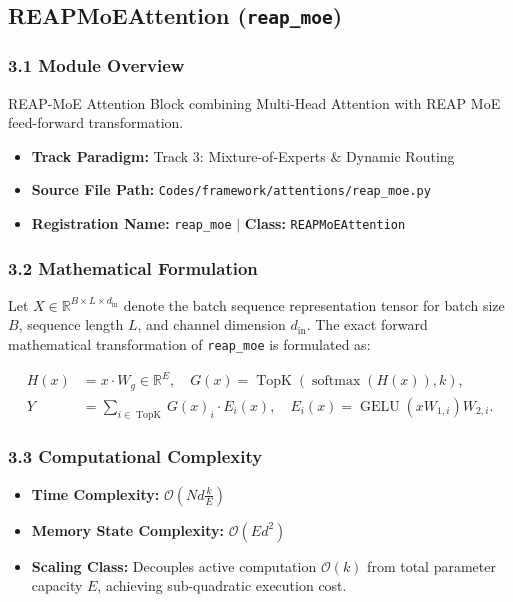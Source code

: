 \subsection{REAPMoEAttention (\texttt{reap\_moe})}
\label{sec:app_module_reap_moe}

\subsubsection*{3.1 Module Overview}
REAP-MoE Attention Block combining Multi-Head Attention with REAP MoE feed-forward transformation.
\begin{itemize}
    \item \textbf{Track Paradigm:} Track 3: Mixture-of-Experts \& Dynamic Routing
    \item \textbf{Source File Path:} \texttt{Codes/framework/attentions/reap\_moe.py}
    \item \textbf{Registration Name:} \texttt{reap\_moe} $\mid$ \textbf{Class:} \texttt{REAPMoEAttention}
\end{itemize}

\subsubsection*{3.2 Mathematical Formulation}
Let $X \in \mathbb{R}^{B \times L \times d_{\text{in}}}$ denote the batch sequence representation tensor for batch size $B$, sequence length $L$, and channel dimension $d_{\text{in}}$. The exact forward mathematical transformation of \texttt{reap\_moe} is formulated as:

\begin{align}
H(x) &= x \cdot W_g \in \mathbb{R}^{E}, \quad G(x) = \operatorname{TopK}\left(\operatorname{softmax}(H(x)), k\right), \\
Y &= \sum_{i \in \operatorname{TopK}} G(x)_i \cdot E_i(x), \quad E_i(x) = \operatorname{GELU}(x W_{1, i}) W_{2, i}.
\end{align}


\subsubsection*{3.3 Computational Complexity}
\begin{itemize}
    \item \textbf{Time Complexity:} $\mathcal{O}(N d \frac{k}{E})$
    \item \textbf{Memory State Complexity:} $\mathcal{O}(E d^2)$
    \item \textbf{Scaling Class:} Decouples active computation $\mathcal{O}(k)$ from total parameter capacity $E$, achieving sub-quadratic execution cost.
\end{itemize}

